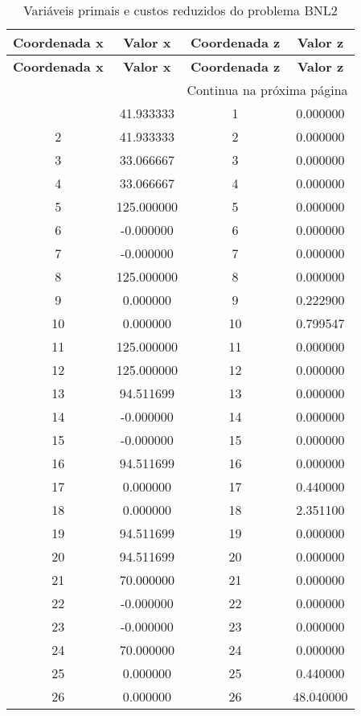 \documentclass[12pt]{article}
\begin{document}
\begin{longtable}{@{}cccc@{}}
\caption{Variáveis primais e custos reduzidos do problema BNL2} \\
\toprule
\textbf{Coordenada x} & \textbf{Valor x} & \textbf{Coordenada z} & \textbf{Valor z} \\
\midrule
\endfirsthead

\toprule
\textbf{Coordenada x} & \textbf{Valor x} & \textbf{Coordenada z} & \textbf{Valor z} \\
\midrule
\endhead

\midrule \multicolumn{4}{r}{{Continua na próxima página}} \\ \midrule
\endfoot

\bottomrule
\endlastfoot
1 & 41.933333 & 1 & 0.000000 \\
2 & 41.933333 & 2 & 0.000000 \\
3 & 33.066667 & 3 & 0.000000 \\
4 & 33.066667 & 4 & 0.000000 \\
5 & 125.000000 & 5 & 0.000000 \\
6 & -0.000000 & 6 & 0.000000 \\
7 & -0.000000 & 7 & 0.000000 \\
8 & 125.000000 & 8 & 0.000000 \\
9 & 0.000000 & 9 & 0.222900 \\
10 & 0.000000 & 10 & 0.799547 \\
11 & 125.000000 & 11 & 0.000000 \\
12 & 125.000000 & 12 & 0.000000 \\
13 & 94.511699 & 13 & 0.000000 \\
14 & -0.000000 & 14 & 0.000000 \\
15 & -0.000000 & 15 & 0.000000 \\
16 & 94.511699 & 16 & 0.000000 \\
17 & 0.000000 & 17 & 0.440000 \\
18 & 0.000000 & 18 & 2.351100 \\
19 & 94.511699 & 19 & 0.000000 \\
20 & 94.511699 & 20 & 0.000000 \\
21 & 70.000000 & 21 & 0.000000 \\
22 & -0.000000 & 22 & 0.000000 \\
23 & -0.000000 & 23 & 0.000000 \\
24 & 70.000000 & 24 & 0.000000 \\
25 & 0.000000 & 25 & 0.440000 \\
26 & 0.000000 & 26 & 48.040000 \\

\end{longtable}
\end{document}
